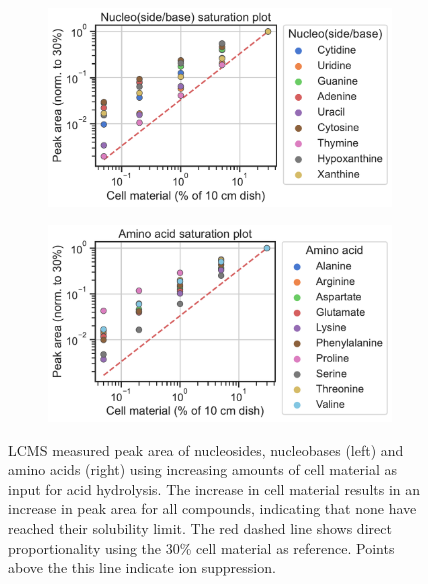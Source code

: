 \begin{figure}[ht]
     \centering
     \begin{subfigure}[b]{0.49\textwidth}
         \includegraphics[width=\textwidth]{figures/chap2/app/hydrolysis_nucl_saturation.pdf}
     \end{subfigure}
     \hfill
     \begin{subfigure}[b]{0.49\textwidth}
         \includegraphics[width=\textwidth]{figures/chap2/app/hydrolysis_AA_saturation.pdf}
     \end{subfigure}
        \caption[Nucleoside, nucleobase and amino acid, hydrolysis saturation.]{
        LCMS measured peak area of nucleosides, nucleobases (left) and amino acids (right) using increasing amounts of cell material as input for acid hydrolysis.
        The increase in cell material results in an increase in peak area for all compounds, indicating that none have reached their solubility limit.
        The red dashed line shows direct proportionality using the 30\% cell material as reference.
        Points above the this line indicate ion suppression.
        }
        \label{fig:app_ch2:hydrolysis_saturation}
\end{figure}


